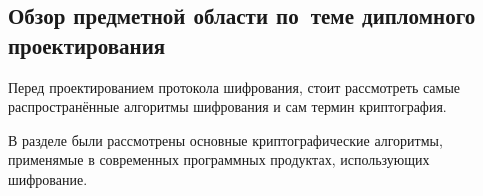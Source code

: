 \subsection{Обзор предметной области по~теме дипломного проектирования}
\label{sec:analysis:research:crypto}

Перед проектированием протокола шифрования, стоит рассмотреть самые распространённые алгоритмы шифрования и сам термин криптография.





В разделе были рассмотрены основные криптографические алгоритмы, применямые в современных программных продуктах, использующих шифрование.
